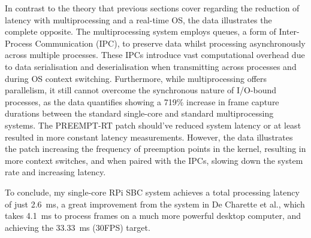 In contrast to the theory that previous sections cover regarding the reduction of latency with multiprocessing and a real-time OS, the data illustrates the complete opposite. The multiprocessing system employs queues, a form of Inter-Process Communication (IPC), to preserve data whilst processing asynchronously across multiple processes. These IPCs introduce vast computational overhead due to data serialisation and deserialisation when transmitting across processes and during OS context switching. Furthermore, while multiprocessing offers parallelism, it still cannot overcome the synchronous nature of I/O-bound processes, as the data quantifies showing a 719\% increase in frame capture durations between the standard single-core and standard multiprocessing systems. The PREEMPT-RT patch should've reduced system latency or at least resulted in more constant latency measurements. However, the data illustrates the patch increasing the frequency of preemption points in the kernel, resulting in more context switches, and when paired with the IPCs, slowing down the system rate and increasing latency.

To conclude, my single-core RPi SBC system achieves a total processing latency of just \SI{2.6}{\milli\second}, a great improvement from the system in De Charette et al., which takes \SI{4.1}{\milli\second} to process frames on a much more powerful desktop computer, and achieving the \SI{33.33}{\milli\second} (30FPS) target.

